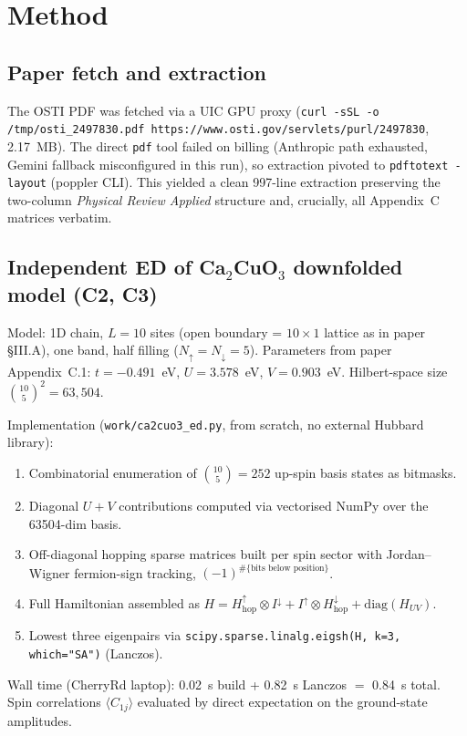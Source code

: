 \documentclass[11pt]{article}
\begin{document}
\section{Method}

\subsection{Paper fetch and extraction}

The OSTI PDF was fetched via a UIC GPU proxy (\texttt{curl -sSL -o /tmp/osti\_2497830.pdf https://www.osti.gov/servlets/purl/2497830}, 2.17~MB). The direct \texttt{pdf} tool failed on billing (Anthropic path exhausted, Gemini fallback misconfigured in this run), so extraction pivoted to \texttt{pdftotext -layout} (poppler CLI). This yielded a clean 997-line extraction preserving the two-column \emph{Physical Review Applied} structure and, crucially, all Appendix~C matrices verbatim.

\subsection{Independent ED of Ca$_2$CuO$_3$ downfolded model (C2, C3)}

Model: 1D chain, $L=10$ sites (open boundary = $10\times 1$ lattice as in paper \S III.A), one band, half filling ($N_\uparrow = N_\downarrow = 5$). Parameters from paper Appendix~C.1: $t = -0.491$~eV, $U = 3.578$~eV, $V = 0.903$~eV. Hilbert-space size $\binom{10}{5}^2 = 63{,}504$.

Implementation (\texttt{work/ca2cuo3\_ed.py}, from scratch, no external Hubbard library):
\begin{enumerate}
    \item Combinatorial enumeration of $\binom{10}{5}=252$ up-spin basis states as bitmasks.
    \item Diagonal $U + V$ contributions computed via vectorised NumPy over the 63504-dim basis.
    \item Off-diagonal hopping sparse matrices built per spin sector with Jordan--Wigner fermion-sign tracking, $(-1)^{\#\{\text{bits below position}\}}$.
    \item Full Hamiltonian assembled as $H = H_{\text{hop}}^{\uparrow} \otimes I^{\downarrow} + I^{\uparrow} \otimes H_{\text{hop}}^{\downarrow} + \mathrm{diag}(H_{UV})$.
    \item Lowest three eigenpairs via \texttt{scipy.sparse.linalg.eigsh(H, k=3, which="SA")} (Lanczos).
\end{enumerate}
Wall time (CherryRd laptop): 0.02~s build + 0.82~s Lanczos $=$ 0.84~s total. Spin correlations $\langle C_{1j}\rangle$ evaluated by direct expectation on the ground-state amplitudes.
\end{document}
